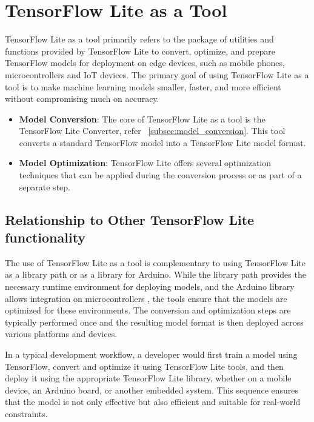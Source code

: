 %
%


\section{TensorFlow Lite as a Tool}

TensorFlow Lite as a tool primarily refers to the package of utilities and functions provided by TensorFlow Lite to convert, optimize, and prepare TensorFlow models for deployment on edge devices, such as mobile phones, microcontrollers and IoT devices. The primary goal of using TensorFlow Lite as a tool is to make machine learning models smaller, faster, and more efficient without compromising much on accuracy. \cite{TensorFlowLite:2024}

\begin{itemize}
	\item \textbf{Model Conversion}: The core of TensorFlow Lite as a tool is the TensorFlow Lite Converter, refer ~\ref{subsec:model_conversion}. This tool converts a standard TensorFlow model into a  TensorFlow Lite model format.
	\item \textbf{Model Optimization}: TensorFlow Lite offers several optimization techniques that can be applied during the conversion process or as part of a separate step.
\end{itemize}


\subsection{Relationship to Other TensorFlow Lite functionality}
The use of TensorFlow Lite as a tool is complementary to using TensorFlow Lite as a library path or as a library for Arduino. While the library path provides the necessary runtime environment for deploying models, and the Arduino library allows integration on microcontrollers \cite{TensorFlowLiteMicrocontrollers:2024}, the tools ensure that the models are optimized for these environments. The conversion and optimization steps are typically performed once and the resulting model format  is then deployed across various platforms and devices. \cite{TensorFlowLiteModelConversion:2024}

In a typical development workflow, a developer would first train a model using TensorFlow, convert and optimize it using TensorFlow Lite tools, and then deploy it using the appropriate TensorFlow Lite library, whether on a mobile device, an Arduino board, or another embedded system. This sequence ensures that the model is not only effective but also efficient and suitable for real-world constraints.


